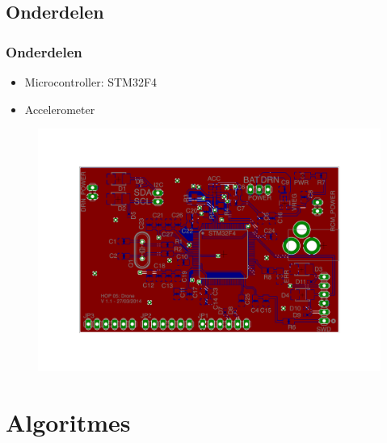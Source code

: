 \documentclass{beamer}
\begin{document}
\subsection{Onderdelen}
  \begin{frame}
    \frametitle{Onderdelen}
    \begin{itemize}
      \item Microcontroller: STM32F4
      \item Accelerometer
    \end{itemize}
  \end{frame}
  \begin{frame}
    \begin{figure}
      \begin{center}
        \includegraphics[width=\textwidth]{images/layout.pdf}
      \end{center}
    \end{figure}
  \end{frame}
\section{Algoritmes}
\end{document}
